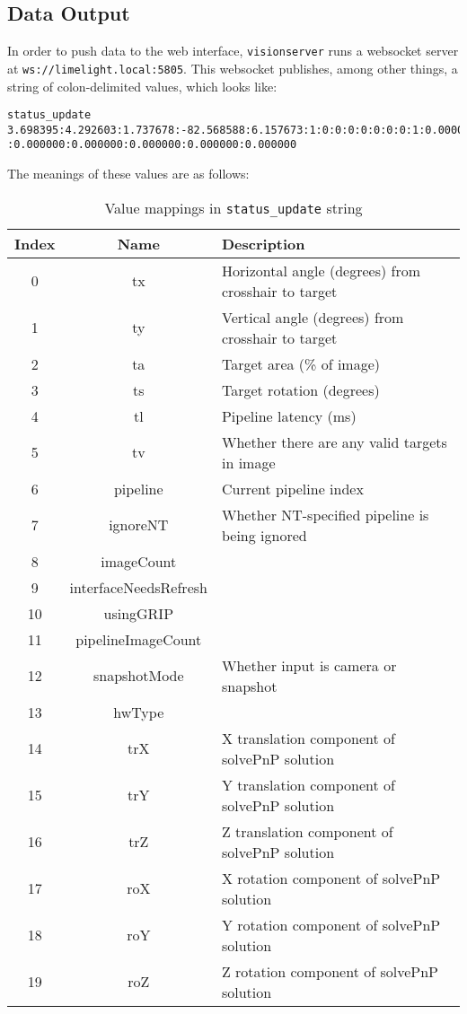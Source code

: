 \documentclass{article}
\begin{document}
\subsection{Data Output}
\par In order to push data to the web interface, \texttt{visionserver} runs a websocket server at \texttt{ws://limelight.local:5805}. This websocket publishes, among other things, a string of colon-delimited values, which looks like: 
\begin{verbatim}
status_update 3.698395:4.292603:1.737678:-82.568588:6.157673:1:0:0:0:0:0:0:0:1:0.000000
:0.000000:0.000000:0.000000:0.000000:0.000000
\end{verbatim}
The meanings of these values are as follows:
\begin{table}[H]
	\centering
	\begin{tabular}{|c|c|l|}
		\hline
		\textbf{Index} & \textbf{Name} & \textbf{Description}\\ \hline
		0 & tx & Horizontal angle (degrees) from crosshair to target\\ \hline
		1 & ty & Vertical angle (degrees) from crosshair to target\\ \hline
		2 & ta & Target area (\% of image)\\ \hline
		3 & ts & Target rotation (degrees)\\ \hline
		4 & tl & Pipeline latency (ms)\\ \hline
		5 & tv & Whether there are any valid targets in image\\ \hline
		6 & pipeline & Current pipeline index\\ \hline
		7 & ignoreNT & Whether NT-specified pipeline is being ignored\\ \hline
		8 & imageCount & \\ \hline
		9 & interfaceNeedsRefresh & \\ \hline
		10 & usingGRIP & \\ \hline
		11 & pipelineImageCount & \\ \hline
		12 & snapshotMode & Whether input is camera or snapshot\\ \hline
		13 & hwType & \\ \hline
		14 & trX & X translation component of solvePnP solution\\ \hline
		15 & trY & Y translation component of solvePnP solution \\ \hline
		16 & trZ & Z translation component of solvePnP solution \\ \hline
		17 & roX & X rotation component of solvePnP solution \\ \hline
		18 & roY & Y rotation component of solvePnP solution \\ \hline
		19 & roZ & Z rotation component of solvePnP solution \\ \hline
	\end{tabular}
	\caption{Value mappings in \texttt{status\_update} string}
	\label{tab:statusupdate}
\end{table}
\end{document}
